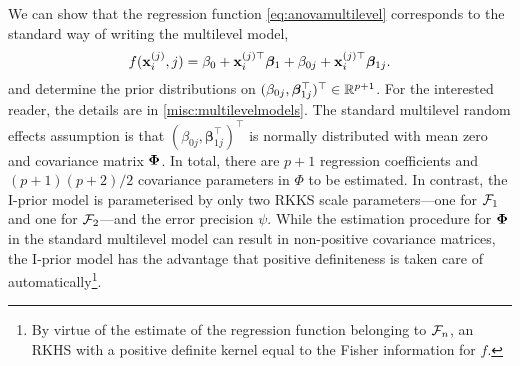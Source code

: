 We can show that the regression function \cref{eq:anovamultilevel} corresponds to the standard way of writing the multilevel model, 
\[
  f({\mathbf x}_i^{(j)}, j) = \beta_0 + {\mathbf x}_i^{(j)\top}\boldsymbol{\beta}_1 + \beta_{0j} + {\mathbf x}_i^{(j)\top}\boldsymbol{\beta}_{1j}.   
\]
and determine the prior distributions on $(\beta_{0j},\boldsymbol{\beta}_{1j}^\top)^\top \in \mathbb{R}^{p+1}$.
For the interested reader, the details are in \cref{misc:multilevelmodels}.
The standard multilevel random effects assumption is that $(\beta_{0j},\boldsymbol{\beta}_{1j}^\top)^\top$ is normally distributed with mean zero and covariance matrix ${\bm\Phi}$.
In total, there are $p+1$ regression coefficients and $(p+1)(p+2)/2$ covariance parameters in $\Phi$ to be estimated.
In contrast, the I-prior model is parameterised by only two RKKS scale parameters---one for ${\mathcal F}_1$ and one for ${\mathcal F}_2$---and the error precision $\psi$.
While the estimation procedure for ${\bm\Phi}$ in the standard multilevel model can result in non-positive covariance matrices, the I-prior model has the advantage that positive definiteness is taken care of automatically\footnote{By virtue of the estimate of the regression function belonging to ${\mathcal F}_n$, an RKHS with a positive definite kernel equal to the Fisher information for $f$.}.

